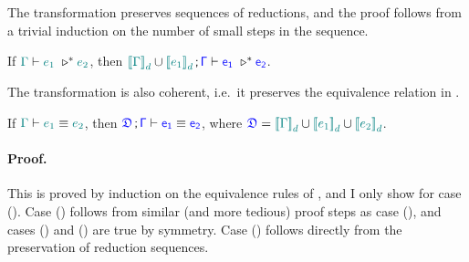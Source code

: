 The transformation preserves sequences of reductions, and the proof follows from a trivial induction on the number of small steps in the sequence.

\begin{lemma} If $\helper{\Gamma} \vdash \helper{e_1}\ \triangleright^* \helper{e_2}$, then
$\helper{\bbracket{\Gamma}_d} \cup \helper{\bbracket{e_1}_d} \semicolon \target{\Gamma} \vdash \target{e_1}\ \triangleright^* \target{e_2}$.
\label{lem:ccs prev sequence}
\end{lemma}


The transformation is also coherent, i.e.~it preserves the equivalence relation in {\ccs}.

\begin{lemma} If $\color{teal}{\Gamma}\color{black} \vdash \color{teal}{e_1}\color{black} \equiv \color{teal}{e_2}\color{black}$, then 
$\target{\fdef} \semicolon \target{\Gamma} \vdash \target{e_1} \equiv \target{e_2}$, where
$\target{\fdef} = \helper{\bbracket{\Gamma}_d} \cup \helper{\bbracket{e_1}_d} \cup \helper{\bbracket{e_2}_d}$.
\paragraph{Proof.} This is proved by induction on the equivalence rules of {\ccs}, and I only show for case (). Case () follows from similar (and more tedious) proof steps as case (), and cases () and () are true by symmetry. Case () follows directly from the preservation of reduction sequences.


\end{lemma}
